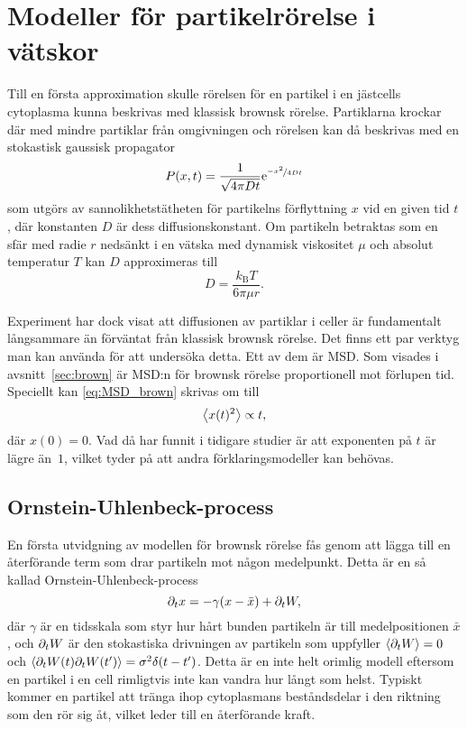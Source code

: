 \section{Modeller för partikelrörelse i vätskor}

Till en första approximation skulle rörelsen för en partikel i en jästcells cytoplasma kunna beskrivas med klassisk brownsk rörelse. Partiklarna krockar där med mindre partiklar från omgivningen och rörelsen kan då beskrivas med en stokastisk gaussisk propagator~\cite{Einstein1905}
\begin{equation}
P(x,t)=\frac{1}{\sqrt{4\pi Dt}}\mathrm{e}^{\nicefrac{-x^2}{4Dt}}
\end{equation} %
som utgörs av sannolikhetstätheten för partikelns förflyttning $x$ vid en given tid $t$, där konstanten $D$ är dess diffusionskonstant. Om partikeln betraktas som en sfär med radie $r$ nedsänkt i en vätska med dynamisk viskositet $\mu$ och absolut temperatur $T$ kan $D$ approximeras till~\cite{Einstein1905}
\begin{equation}
D=\frac{k_\text{B} T}{6\pi \mu r}.
\end{equation}

Experiment\cite{Midtveldt_etal2016} har dock visat att diffusionen av partiklar i celler är fundamentalt långsammare än förväntat från klassisk brownsk rörelse. Det finns ett par verktyg man kan använda för att undersöka detta. Ett av dem är MSD. Som visades i avsnitt~\ref{sec:brown} är MSD:n för brownsk rörelse proportionell mot förlupen tid. Speciellt kan \eqref{eq:MSD_brown} skrivas om till
\begin{equation}
\ev{x(t)^2} \propto t,
\end{equation}
där $x(0)=0$. Vad \cite{Midtveldt_etal2016} då har funnit i tidigare studier är att exponenten på $t$ är lägre än~$1$, vilket tyder på att andra förklaringsmodeller kan behövas.


\subsection{Ornstein-Uhlenbeck-process}
En första utvidgning av modellen för brownsk rörelse fås genom att lägga till en återförande term som drar partikeln mot någon medelpunkt. Detta är en så kallad Ornstein-Uhlenbeck-process
\begin{equation}\label{eq:SDE_o-u}
\partial_t x = -\gamma ( x-\bar{x} ) + \partial_t W,
\end{equation}
där $\gamma$ är en tidsskala som styr hur hårt bunden partikeln är till medelpositionen $\bar{x}$, och $\partial_t W$ är den stokastiska drivningen av partikeln som uppfyller $\ev{\pd_t W}=0$ och $\ev{\pd_t W(t)\pd_t W(t')} = \sigma^2\delta(t-t')$. Detta är en inte helt orimlig modell eftersom en partikel i en cell rimligtvis inte kan vandra hur långt som helst. Typiskt kommer en partikel att tränga ihop cytoplasmans beståndsdelar i den riktning som den rör sig åt, vilket leder till en återförande kraft.

